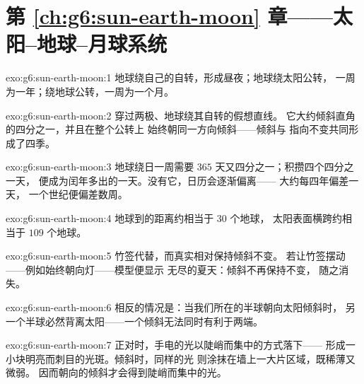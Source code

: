 \section*{第 \ref{ch:g6:sun-earth-moon} 章——太阳–地球–月球系统}

\begin{solution}{exo:g6:sun-earth-moon:1}
地球绕自己的自转，形成昼夜；地球绕太阳公转，
一周为一年；绕地球公转，一周为一个月。
\end{solution}

\begin{solution}{exo:g6:sun-earth-moon:2}
穿过两极、地球绕其自转的假想直线。
它大约倾斜直角的四分之一，并且在整个公转上
始终朝同一方向倾斜——倾斜与
指向不变共同形成了四季。
\end{solution}

\begin{solution}{exo:g6:sun-earth-moon:3}
地球绕日一周需要 $365$ 天又四分之一；积攒四个四分之一天，
便成为闰年多出的一天。没有它，日历会逐渐偏离——
大约每四年偏差一天，
一个世纪便偏差数周。
\end{solution}

\begin{solution}{exo:g6:sun-earth-moon:4}
地球到的距离约相当于 $30$ 个地球，
太阳表面横跨约相当于 $109$ 个地球。
\end{solution}

\begin{solution}{exo:g6:sun-earth-moon:5}
竹签代替，而真实相对保持倾斜不变。
若让竹签摆动——例如始终朝向灯——模型便显示
无尽的夏天：倾斜不再保持不变，
随之消失。
\end{solution}

\begin{solution}{exo:g6:sun-earth-moon:6}
相反的情况是：当我们所在的半球朝向太阳倾斜时，
另一个半球必然背离太阳——一个倾斜无法同时有利于两端。
\end{solution}

\begin{solution}{exo:g6:sun-earth-moon:7}
正对时，手电的光以陡峭而集中的方式落下——
形成一小块明亮而刺目的光斑。倾斜时，同样的光
则涂抹在墙上一大片区域，既稀薄又微弱。
因而朝向的倾斜才会得到陡峭而集中的光。
\end{solution}

